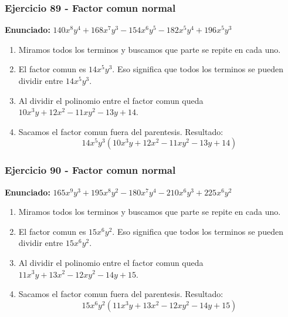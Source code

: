 \documentclass[11pt,a4paper]{article}
\begin{document}
\subsubsection*{Ejercicio 89 - Factor comun normal}
\textbf{Enunciado:} $ 140 x^{8} y^{4} + 168 x^{7} y^{3} - 154 x^{6} y^{5} - 182 x^{5} y^{4} + 196 x^{5} y^{3} $\par
\begin{enumerate}[leftmargin=2em]
\item Miramos todos los terminos y buscamos que parte se repite en cada uno.
\item El factor comun es \(14 x^{5} y^{3}\). Eso significa que todos los terminos se pueden dividir entre \(14 x^{5} y^{3}\).
\item Al dividir el polinomio entre el factor comun queda \(10 x^{3} y + 12 x^{2} - 11 x y^{2} - 13 y + 14\).
\item Sacamos el factor comun fuera del parentesis. Resultado: \[\boxed{14 x^{5} y^{3}\left(10 x^{3} y + 12 x^{2} - 11 x y^{2} - 13 y + 14\right)}\]
\end{enumerate}

\vspace{0.2cm}
\subsubsection*{Ejercicio 90 - Factor comun normal}
\textbf{Enunciado:} $ 165 x^{9} y^{3} + 195 x^{8} y^{2} - 180 x^{7} y^{4} - 210 x^{6} y^{3} + 225 x^{6} y^{2} $\par
\begin{enumerate}[leftmargin=2em]
\item Miramos todos los terminos y buscamos que parte se repite en cada uno.
\item El factor comun es \(15 x^{6} y^{2}\). Eso significa que todos los terminos se pueden dividir entre \(15 x^{6} y^{2}\).
\item Al dividir el polinomio entre el factor comun queda \(11 x^{3} y + 13 x^{2} - 12 x y^{2} - 14 y + 15\).
\item Sacamos el factor comun fuera del parentesis. Resultado: \[\boxed{15 x^{6} y^{2}\left(11 x^{3} y + 13 x^{2} - 12 x y^{2} - 14 y + 15\right)}\]
\end{enumerate}

\vspace{0.2cm}
\end{document}
